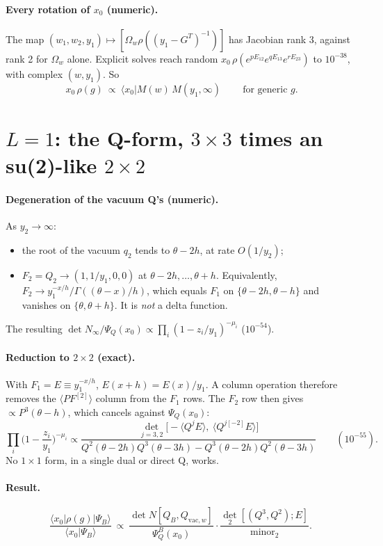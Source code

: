 \documentclass[11pt]{article}
\newcommand{\bra}[1]{\langle #1|}
\newcommand{\ket}[1]{|#1\rangle}
\newcommand{\Om}{\Omega}
\newcommand{\vac}{\mathrm{vac}}
\begin{document}
\paragraph{Every rotation of $x_0$ (numeric).} The map $(w_1,w_2,y_1)\mapsto[\Om_w\rho((y_1-G^T)^{-1})]$ has Jacobian rank 3, against rank 2 for $\Om_w$ alone. Explicit solves reach random $x_0\,\rho(e^{pE_{12}}e^{qE_{13}}e^{rE_{23}})$ to $10^{-38}$, with complex $(w,y_1)$. So
\[
\boxed{\ x_0\,\rho(g)\ \propto\ \bra{x_0}M(w)\,M(y_1,\infty)\ }\qquad\text{for generic }g.
\]

\section{$L=1$: the Q-form, $3\times3$ times an su(2)-like $2\times2$}

\paragraph{Degeneration of the vacuum Q's (numeric).} As $y_2\to\infty$:
\begin{itemize}
\item the root of the vacuum $q_2$ tends to $\theta-2h$, at rate $O(1/y_2)$;
\item $F_2=Q_2\to(1,1/y_1,0,0)$ at $\theta-2h,\dots,\theta+h$. Equivalently, $F_2\to y_1^{-x/h}/\Gamma((\theta-x)/h)$, which equals $F_1$ on $\{\theta-2h,\theta-h\}$ and vanishes on $\{\theta,\theta+h\}$. It is \emph{not} a delta function.
\end{itemize}
The resulting $\det N_\infty/\Psi_Q(x_0)\propto\prod_i(1-z_i/y_1)^{-\mu_i}$ ($10^{-54}$).

\paragraph{Reduction to $2\times2$ (exact).} With $F_1=E\equiv y_1^{-x/h}$, $E(x+h)=E(x)/y_1$. A column operation therefore removes the $\langle PF^{[2]}\rangle$ column from the $F_1$ rows. The $F_2$ row then gives $\propto P^3(\theta-h)$, which cancels against $\Psi_Q(x_0)$:
\[
\prod_i\Big(1-\frac{z_i}{y_1}\Big)^{-\mu_i}\propto\frac{\det_{j=3,2}\big[-\langle Q^jE\rangle,\ \langle Q^{j[-2]}E\rangle\big]}{Q^2(\theta-2h)Q^3(\theta-3h)-Q^3(\theta-2h)Q^2(\theta-3h)}\qquad(10^{-55}).
\]
No $1\times1$ form, in a single dual or direct Q, works.

\paragraph{Result.}
\[
\frac{\bra{x_0}\rho(g)\ket{\Psi_B}}{\langle x_0|\Psi_B\rangle}\ \propto\ \frac{\det N[Q_B,Q_{\vac,w}]}{\Psi_Q^B(x_0)}\cdot\frac{\det_2[(Q^3,Q^2);E]}{\text{minor}_2}.
\]
\end{document}
